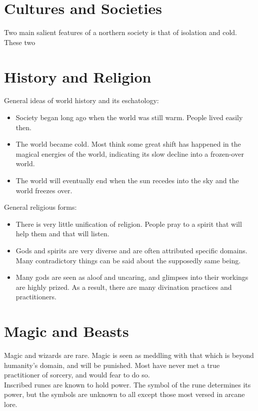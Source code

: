\documentclass[a4paper]{article}
\begin{document}
\begin{multicols}{2}
\section{Cultures and Societies}

Two main salient features of a northern society is that of isolation and cold.
These two 


\section{History and Religion}

General ideas of world history and its eschatology:

\begin{itemize}
\item Society began long ago when the world was still warm. People lived easily then.
\item The world became cold. Most think some great shift has happened in the magical energies of the world, indicating its slow decline into a frozen-over world.
\item The world will eventually end when the sun recedes into the sky and the world freezes over.
\end{itemize}

General religious forms:

\begin{itemize}
\item There is very little unification of religion. People pray to a spirit that will help them and that will listen.
\item Gods and spirits are very diverse and are often attributed specific domains. Many contradictory things can be said about the supposedly same being.
\item Many gods are seen as aloof and uncaring, and glimpses into their workings are highly prized. As a result, there are many divination practices and practitioners.
\end{itemize}

\section{Magic and Beasts}

Magic and wizards are rare. Magic is seen as meddling with that which is beyond humanity's domain, and will be punished. Most have never met a true practitioner of sorcery, and would fear to do so. \\

Inscribed runes are known to hold power. The symbol of the rune determines its power, but the symbols are unknown to all except those most versed in arcane lore. \\


\end{multicols}
\end{document}
